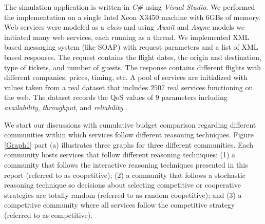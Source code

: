 The simulation application is written in
\textit{C\#} using \textit{Visual Studio}. We performed the implementation on a single Intel Xeon X3450 machine with 6GBs of memory. Web services were modeled as a \emph{class} and using \emph{Await} and \emph{Async} models we initiated many web services, each running as a thread.  We implemented XML based messaging system (like SOAP) with request parameters and a list of XML based responses. The request contains the flight dates, the origin and destination, type of tickets, and number of guests. The response contains different flights with different companies, prices, timing, etc. A pool of services are initialized with values taken from a real dataset that includes $2507$ real services functioning on the web.
The dataset records the QoS values of $9$ parameters including \textit{availability},
\textit{throughput}, and \textit{reliability} \cite{DBLP:conf/www/Al-MasriM07a}.

We start our discussions with cumulative budget comparison
regarding different communities within which services follow
different reasoning techniques. Figure \ref{Graph1} part (a)
illustrates three graphs for three different communities. Each
community hosts services that follow different reasoning
techniques: (1) a community that follows the interactive reasoning
techniques presented in this report (referred to as coopetitive);
(2) a community that follows a stochastic reasoning technique so
decisions about selecting competitive or cooperative strategies
are totally random (referred to as random coopetitive); and (3) a
competitive community where all services follow the competitive
strategy (referred to as competitive).



